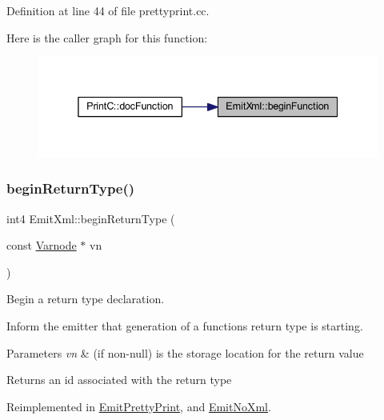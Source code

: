 Definition at line 44 of file prettyprint.\+cc.

Here is the caller graph for this function\+:
\nopagebreak
\begin{figure}[H]
\begin{center}
\leavevmode
\includegraphics[width=338pt]{class_emit_xml_acff5f33b9ab6a4a036688160c98c0aa9_icgraph}
\end{center}
\end{figure}
\mbox{\label{class_emit_xml_ac0216ea06080892db047c720a38ba304}} 
\subsubsection{\texorpdfstring{beginReturnType()}{beginReturnType()}}
{\footnotesize\ttfamily int4 Emit\+Xml\+::begin\+Return\+Type (\begin{DoxyParamCaption}\item[{const \mbox{\hyperlink{class_varnode}{Varnode}} $\ast$}]{vn }\end{DoxyParamCaption})\hspace{0.3cm}{\ttfamily [virtual]}}



Begin a return type declaration. 

Inform the emitter that generation of a function\textquotesingle{}s return type is starting. 
\begin{DoxyParams}{Parameters}
{\em vn} & (if non-\/null) is the storage location for the return value \\
\hline
\end{DoxyParams}
\begin{DoxyReturn}{Returns}
an id associated with the return type 
\end{DoxyReturn}


Reimplemented in \mbox{\hyperlink{class_emit_pretty_print_a0318a1f41c45d521b22ca097a4a29793}{Emit\+Pretty\+Print}}, and \mbox{\hyperlink{class_emit_no_xml_a6f9c0d9a1be5e530a503fbc1e7b79687}{Emit\+No\+Xml}}.



